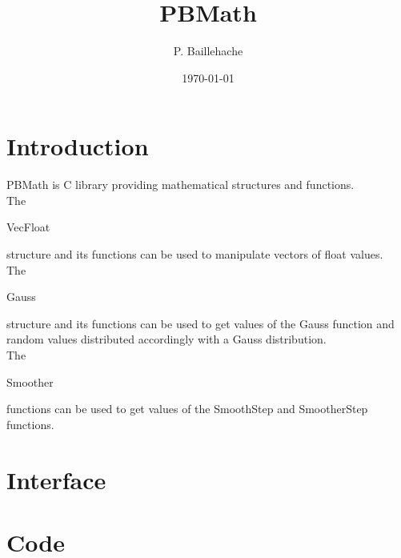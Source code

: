 \documentclass[12pt, a4paper]{article}
\begin{document}
\title{PBMath}
\author{P. Baillehache}
\date{\today}
\maketitle

\tableofcontents

\section*{Introduction}

PBMath is C library providing mathematical structures and functions.\\ 

The \begin{ttfamily}VecFloat\end{ttfamily} structure and its functions can be used to manipulate vectors of float values.\\

The \begin{ttfamily}Gauss\end{ttfamily} structure and its functions can be used to get values of the Gauss function and random values distributed accordingly with a Gauss distribution.\\

The \begin{ttfamily}Smoother\end{ttfamily} functions can be used to get values of the SmoothStep and SmootherStep functions.\\

\section{Interface}

\begin{scriptsize}
\begin{ttfamily}

\end{ttfamily}
\end{scriptsize}

\section{Code}

\begin{scriptsize}
\begin{ttfamily}

\end{ttfamily}
\end{scriptsize}
\end{document}
